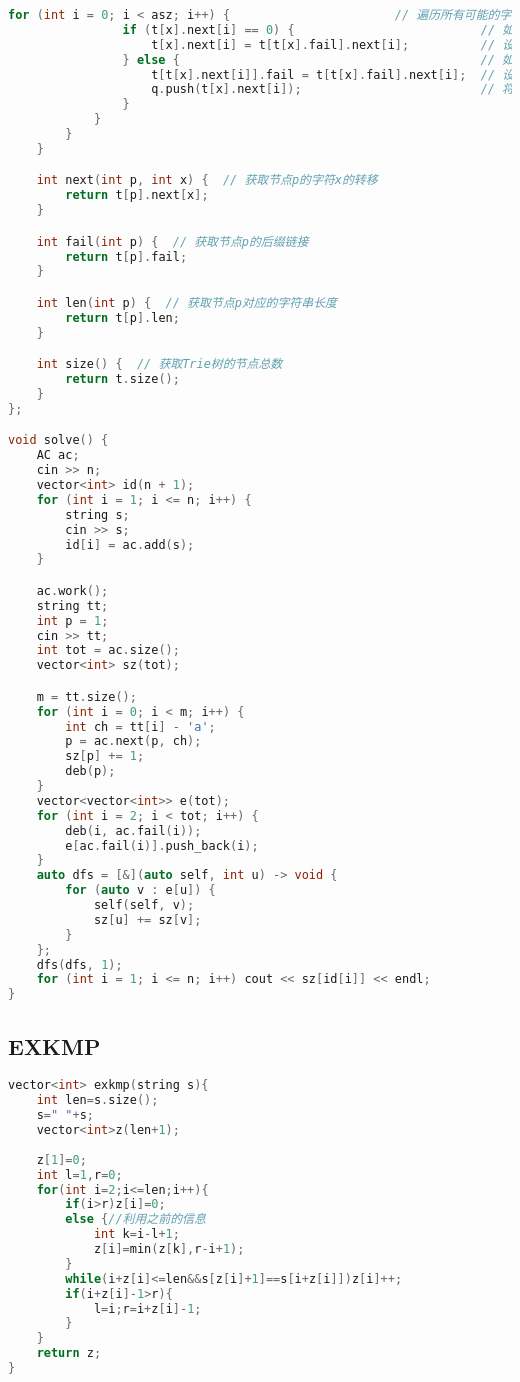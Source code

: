 \begin{lstlisting}[language=C++]
            for (int i = 0; i < asz; i++) {                       // 遍历所有可能的字符
                if (t[x].next[i] == 0) {                          // 如果当前节点没有对应字符的转移
                    t[x].next[i] = t[t[x].fail].next[i];          // 设置为后缀链接节点的对应转移
                } else {                                          // 如果有对应字符的转移
                    t[t[x].next[i]].fail = t[t[x].fail].next[i];  // 设置新节点的后缀链接
                    q.push(t[x].next[i]);                         // 将新节点加入队列
                }
            }
        }
    }

    int next(int p, int x) {  // 获取节点p的字符x的转移
        return t[p].next[x];
    }

    int fail(int p) {  // 获取节点p的后缀链接
        return t[p].fail;
    }

    int len(int p) {  // 获取节点p对应的字符串长度
        return t[p].len;
    }

    int size() {  // 获取Trie树的节点总数
        return t.size();
    }
};

void solve() {
    AC ac;
    cin >> n;
    vector<int> id(n + 1);
    for (int i = 1; i <= n; i++) {
        string s;
        cin >> s;
        id[i] = ac.add(s);
    }

    ac.work();
    string tt;
    int p = 1;
    cin >> tt;
    int tot = ac.size();
    vector<int> sz(tot);

    m = tt.size();
    for (int i = 0; i < m; i++) {
        int ch = tt[i] - 'a';
        p = ac.next(p, ch);
        sz[p] += 1;
        deb(p);
    }
    vector<vector<int>> e(tot);
    for (int i = 2; i < tot; i++) {
        deb(i, ac.fail(i));
        e[ac.fail(i)].push_back(i);
    }
    auto dfs = [&](auto self, int u) -> void {
        for (auto v : e[u]) {
            self(self, v);
            sz[u] += sz[v];
        }
    };
    dfs(dfs, 1);
    for (int i = 1; i <= n; i++) cout << sz[id[i]] << endl;
}
\end{lstlisting}
\subsection{EXKMP}
\begin{lstlisting}[language=C++]
vector<int> exkmp(string s){
	int len=s.size();
	s=" "+s;
	vector<int>z(len+1);
	
	z[1]=0;
	int l=1,r=0;
	for(int i=2;i<=len;i++){
		if(i>r)z[i]=0;
		else {//利用之前的信息
			int k=i-l+1;
			z[i]=min(z[k],r-i+1);
		}
		while(i+z[i]<=len&&s[z[i]+1]==s[i+z[i]])z[i]++;
		if(i+z[i]-1>r){
			l=i;r=i+z[i]-1;
		}
	}
	return z;
}
\end{lstlisting}
